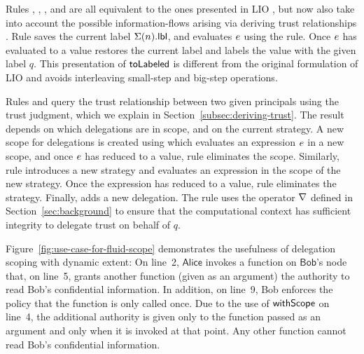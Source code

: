 Rules , , ,  and  are all equivalent to the ones presented in LIO \cite{SRMMlio}, but now also take into account the possible information-flows arising via deriving trust relationships \cite{Arden:2015:FA:2859845.2859998}. Rule  saves the current label $\Sigma(n).\mathsf{lbl}$, and evaluates $e$ using the  rule. Once $e$ has evaluated to a value  restores the current label and labels the value with the given label $q$. This presentation of $\mathsf{toLabeled}$ is different from the original formulation of LIO \cite{SRMMlio} and avoids interleaving small-step and big-step operations.


Rules  and  query the trust relationship between two given principals using the trust judgment, which we explain in Section~\ref{subsec:deriving-trust}. The result depends on which delegations are in scope, and on the current strategy. A new scope for delegations is created using  which evaluates an expression $e$ in a new scope, and once $e$ has reduced to a value, rule  eliminates the scope. Similarly, rule  introduces a new strategy and evaluates an expression in the scope of the new strategy. Once the expression has reduced to a value, rule  eliminates the strategy. Finally,  adds a new delegation. The rule uses the operator $\nabla$ defined in Section~\ref{sec:background} to ensure that the computational context has sufficient integrity to delegate trust on behalf of $q$.



Figure~\ref{fig:use-case-for-fluid-scope} demonstrates the usefulness of delegation scoping with dynamic extent: On line~2, $\mathsf{Alice}$ invokes a function on $\mathsf{Bob}$'s node that, on line~5, grants another function (given as an argument) the authority to read Bob's confidential information. In addition, on line~9, Bob enforces the policy that the function is only called once. Due to the use of $\mathsf{withScope}$ on line~4, the additional authority is given only to the function passed as an argument and only when it is invoked at that point. Any other function cannot read Bob's confidential information.

